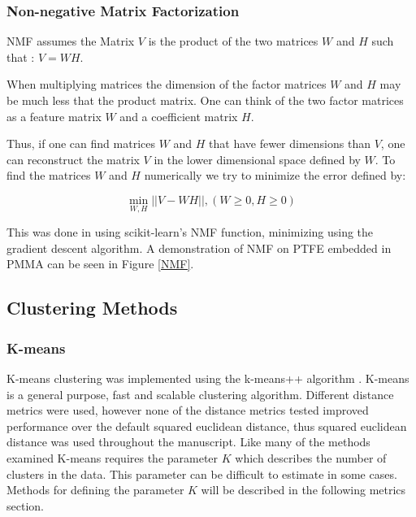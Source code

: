 \documentclass[a4paper,11pt]{article}
\begin{document}
\subsubsection{Non-negative Matrix Factorization}

NMF assumes the Matrix $V$ is the product of the two matrices $W$ and $H$ such that : $V = WH$. 

When multiplying matrices the dimension of the factor matrices $W$ and $H$ may be much less that the product matrix. One can think of the two factor matrices as a feature matrix $W$ and a coefficient matrix $H$.

Thus, if one can find matrices $W$ and $H$ that have fewer dimensions than $V$, one can reconstruct the matrix $V$ in the lower dimensional space defined by $W$. To find the matrices $W$ and $H$ numerically we try to minimize the error defined by:

\begin{equation}
\min_{W,H} || V - WH ||, ( W \geq 0, H \geq 0 )
\end{equation}

This was done in using scikit-learn's NMF function, minimizing using the gradient descent algorithm. A demonstration of NMF on PTFE embedded in PMMA can be seen in Figure \ref{NMF}.

\subsection{Clustering Methods}

\subsubsection{K-means}

K-means clustering was implemented using the k-means++ algorithm \cite{ArthurK-means++:Seeding}. K-means is a general purpose, fast and scalable clustering algorithm. Different distance metrics were used, however none of the distance metrics tested improved performance over the default squared euclidean distance, thus squared euclidean distance was used throughout the manuscript. Like many of the methods examined K-means requires the parameter $K$ which describes the number of clusters in the data. This parameter can be difficult to estimate in some cases. Methods for defining the parameter $K$ will be described in the following metrics section.
\end{document}
